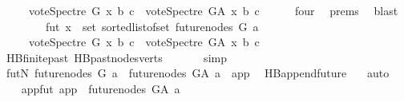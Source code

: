 \begin{isabellebody}
\ \ \ \ {\isasymLongrightarrow}\ vote{\isacharunderscore}{\kern0pt}Spectre\ G\ x\ b\ c\ {\isasymle}\ vote{\isacharunderscore}{\kern0pt}Spectre\ G{\isacharunderscore}{\kern0pt}A\ x\ b\ c{\isachardoublequoteclose}\ \isanewline
\ \ \isamarkupfalse%
\ {}{\isacharparenleft}{\kern0pt}{}{\isacharcomma}{\kern0pt}{}{\isacharparenright}{\kern0pt}\ four\isanewline
\ \ {\isachardoublequoteopen}{}{\isachardot}{\kern0pt}prems{\isachardoublequoteclose}{\isacharparenleft}{\kern0pt}{}{\isacharparenright}{\kern0pt}\ \isamarkupfalse%
\ blast\ \isanewline
\ \ \isanewline
\ \ \isamarkupfalse%
\ \isamarkupfalse%
\ fut{\isacharcolon}{\kern0pt}\ {\isachardoublequoteopen}{\isasymforall}x\ {\isasymin}\ set\ {\isacharparenleft}{\kern0pt}sorted{\isacharunderscore}{\kern0pt}list{\isacharunderscore}{\kern0pt}of{\isacharunderscore}{\kern0pt}set\ {\isacharparenleft}{\kern0pt}future{\isacharunderscore}{\kern0pt}nodes\ G\ a{\isacharparenright}{\kern0pt}{\isacharparenright}{\kern0pt}{\isachardot}{\kern0pt}\ \isanewline
\ \ \ \ \ {\isacharparenleft}{\kern0pt}vote{\isacharunderscore}{\kern0pt}Spectre\ G\ x\ b\ c{\isacharparenright}{\kern0pt}\ {\isasymle}\ {\isacharparenleft}{\kern0pt}vote{\isacharunderscore}{\kern0pt}Spectre\ G{\isacharunderscore}{\kern0pt}A\ x\ b\ c{\isacharparenright}{\kern0pt}{\isachardoublequoteclose}\isanewline
\ \ \ \ \isamarkupfalse%
\ HB{}{\isachardot}{\kern0pt}finite{\isacharunderscore}{\kern0pt}past\ HB{}{\isachardot}{\kern0pt}past{\isacharunderscore}{\kern0pt}nodes{\isacharunderscore}{\kern0pt}verts\ \isanewline
\ \ \ \ \isamarkupfalse%
\ simp\isanewline
\ \ \isamarkupfalse%
\ futN{\isacharcolon}{\kern0pt}\ {\isachardoublequoteopen}future{\isacharunderscore}{\kern0pt}nodes\ G\ a\ {\isacharequal}{\kern0pt}\ future{\isacharunderscore}{\kern0pt}nodes\ G{\isacharunderscore}{\kern0pt}A\ a\ {\isacharminus}{\kern0pt}\ {\isacharbraceleft}{\kern0pt}app{\isacharbraceright}{\kern0pt}{\isachardoublequoteclose}\ \isamarkupfalse%
\ HB{}{\isachardot}{\kern0pt}append{\isacharunderscore}{\kern0pt}future\ {}{\isacharparenleft}{\kern0pt}{}{\isacharparenright}{\kern0pt}\ \isamarkupfalse%
\ auto\ \isanewline
\ \ \isamarkupfalse%
\ appfut{\isacharcolon}{\kern0pt}\ {\isachardoublequoteopen}app\ {\isasymin}\ future{\isacharunderscore}{\kern0pt}nodes\ G{\isacharunderscore}{\kern0pt}A\ a{\isachardoublequoteclose}\ \isamarkupfalse%

\end{isabellebody}

